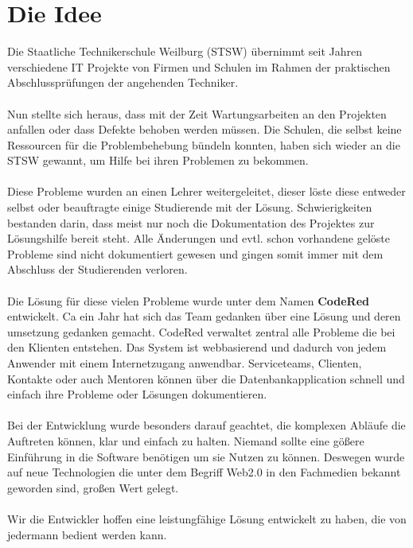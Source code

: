 \chapter{Die Idee}  %
\label{chapter:Die Idee}  %

Die Staatliche Technikerschule Weilburg (STSW)
übernimmt seit Jahren verschiedene IT Projekte
von Firmen und Schulen im Rahmen der praktischen
Abschlussprüfungen der angehenden Techniker. \\
\\
Nun stellte sich heraus, dass mit der Zeit
Wartungsarbeiten an den Projekten anfallen oder
dass Defekte behoben werden müssen.
Die Schulen, die selbst keine Ressourcen für die
Problembehebung bündeln konnten, haben sich
wieder an die STSW gewannt, um Hilfe bei ihren
Problemen zu bekommen. \\
\\
Diese Probleme wurden an einen Lehrer weitergeleitet,
dieser löste diese entweder selbst oder
beauftragte einige Studierende mit der Lösung.
Schwierigkeiten bestanden darin, dass meist nur noch die
Dokumentation des Projektes zur Lösungshilfe bereit
steht. Alle Änderungen und evtl. schon vorhandene
gelöste Probleme sind nicht dokumentiert gewesen und gingen
somit immer mit dem Abschluss der Studierenden verloren.\\
\\
Die Lösung für diese vielen Probleme wurde unter dem Namen \textbf{CodeRed} 
entwickelt. Ca ein Jahr hat sich das Team gedanken über eine Lösung und 
deren umsetzung gedanken gemacht. CodeRed verwaltet zentral alle Probleme 
die bei den Klienten entstehen. Das System ist webbasierend und dadurch von jedem 
Anwender mit einem Internetzugang anwendbar. Serviceteams, Clienten, Kontakte oder auch Mentoren können über die Datenbankapplication schnell und einfach ihre Probleme oder Lösungen dokumentieren. \\
\\
Bei der Entwicklung wurde besonders darauf geachtet, die komplexen Abläufe die Auftreten können, klar und einfach zu halten. Niemand sollte eine gößere Einführung in die Software benötigen um sie Nutzen zu können. Deswegen wurde auf neue Technologien die unter dem Begriff Web2.0 in den Fachmedien bekannt geworden sind, großen Wert gelegt.\\
\\
Wir die Entwickler hoffen eine leistungfähige Lösung entwickelt zu haben, die von jedermann bedient werden kann.   
